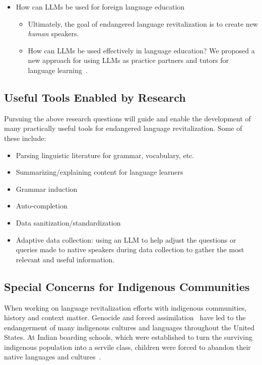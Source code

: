 \documentclass{article}
\begin{document}
\begin{itemize}
\begin{itemize}
    \end{itemize}
    \item How can LLMs be used for foreign language education
    \begin{itemize}
        \item Ultimately, the goal of endangered language revitalization is to create new \textit{human} speakers.
        \item How can LLMs be used effectively in language education? We proposed a new approach for using LLMs as practice partners and tutors for language learning~\cite{yu2023chatlang}.
    \end{itemize}
\end{itemize}

\subsection*{Useful Tools Enabled by Research}
Pursuing the above research questions will guide and enable the development of many practically useful tools for endangered language revitalization.
Some of these include:
\begin{itemize}
    \item Parsing linguistic literature for grammar, vocabulary, etc.
    \item Summarizing/explaining content for language learners
    \item Grammar induction
    \item Auto-completion
    \item Data sanitization/standardization
    \item Adaptive data collection: using an LLM to help adjust the questions or queries made to native speakers during data collection to gather the most relevant and useful information.
\end{itemize}

\subsection*{Special Concerns for Indigenous Communities}
When working on language revitalization efforts with indigenous communities, history and context matter.
Genocide and forced assimilation~\cite{genocide} have led to the endangerment of many indigenous cultures and languages throughout the United States.
At Indian boarding schools, which were established to turn the surviving indigenous population into a servile class, children were forced to abandon their native languages and cultures~\cite{to-remain-an-indian}.
\end{document}
